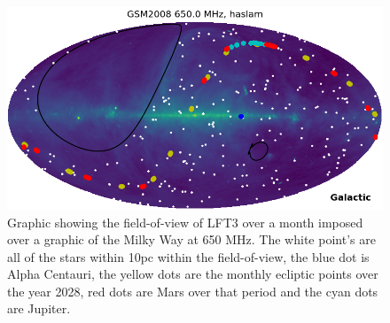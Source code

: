 \begin{figure}
    \centering
    \includegraphics[width=0.95\linewidth]{figures/galaxy_plot.png}
    \caption{Graphic showing the field-of-view of LFT3 over a month imposed over a graphic of the Milky Way at 650 MHz.  The white point's are all of the stars within 10pc within the field-of-view, the blue dot is Alpha Centauri, the yellow dots are the monthly ecliptic points over the year 2028, red dots are Mars over that period and the cyan dots are Jupiter.}
    \label{fig:fieldofview}
\end{figure}



